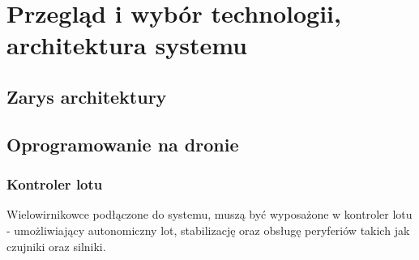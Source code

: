 \chapter{Przegląd i wybór technologii, architektura systemu}

\section{Zarys architektury}


	

	
	
	 

\section{Oprogramowanie na dronie}

\subsection{Kontroler lotu}

Wielowirnikowce podłączone do systemu, muszą być
wyposażone w kontroler lotu - umożliwiający
autonomiczny lot, stabilizację oraz obsługę 
peryferiów takich jak czujniki oraz silniki.


